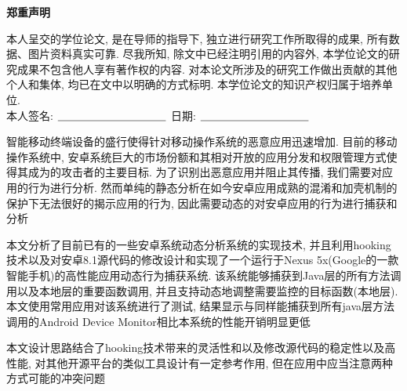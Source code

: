 


\newpage
\vspace*{20pt}
\begin{center}{\textbf{\songti{} 郑重声明}}\end{center}
\par\vspace*{30pt}
\renewcommand{\baselinestretch}{2}

{%

本人呈交的学位论文, 是在导师的指导下, 独立进行研究工作所取得的成果,
所有数据、图片资料真实可靠. 尽我所知, 除文中已经注明引用的内容外,
本学位论文的研究成果不包含他人享有著作权的内容.
对本论文所涉及的研究工作做出贡献的其他个人和集体,
均已在文中以明确的方式标明. 本学位论文的知识产权归属于培养单位.\\[2cm]

\hspace*{1cm}本人签名: $\underline{\hspace{3.5cm}}$
\hspace{2cm}日期: $\underline{\hspace{3.5cm}}$\hfill\par}
\baselineskip=23pt  %





\begin{cnabstract}
智能移动终端设备的盛行使得针对移动操作系统的恶意应用迅速增加. 目前的移动操作系统中, 安卓系统巨大的市场份额和其相对开放的应用分发和权限管理方式使得其成为的攻击者的主要目标. 为了识别出恶意应用并阻止其传播, 我们需要对应用的行为进行分析. 然而单纯的静态分析在如今安卓应用成熟的混淆和加壳机制的保护下无法很好的揭示应用的行为, 因此需要动态的对安卓应用的行为进行捕获和分析\juhao 

本文分析了目前已有的一些安卓系统动态分析系统的实现技术, 并且利用hooking技术以及对安卓8.1源代码的修改设计和实现了一个运行于Nexus 5x(Google的一款智能手机)的高性能应用动态行为捕获系统. 该系统能够捕获到Java层的所有方法调用以及本地层的重要函数调用, 并且支持动态地调整需要监控的目标函数(本地层). 本文使用常用应用对该系统进行了测试, 结果显示与同样能捕获到所有java层方法调用的Android Device Monitor相比本系统的性能开销明显更低\juhao 

本文设计思路结合了hooking技术带来的灵活性和以及修改源代码的稳定性以及高性能, 对其他开源平台的类似工具设计有一定参考作用, 但在应用中应当注意两种方式可能的冲突问题\juhao 




\end{cnabstract}
\par
\vspace*{2em}


